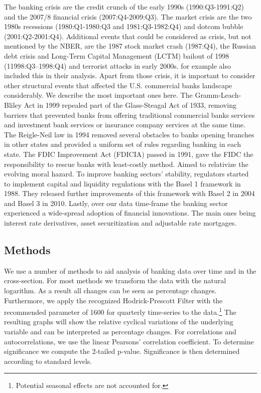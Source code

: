 \documentclass[12pt, a4paper]{article} %
\begin{document}
The banking crisis are the credit crunch of the early 1990s (1990:Q3-1991:Q2) and the 2007/8 financial crisis (2007:Q4-2009:Q3). The market crisis are the two 1980s recessions (1980:Q1-1980:Q3 and 1981:Q3-1982:Q4) and dotcom bubble (2001:Q2-2001:Q4). Additional events that could be considered as crisis, but not mentioned by the NBER, are the 1987 stock market crash (1987:Q4), the Russian debt crisis and Long-Term Capital Management (LCTM) bailout of 1998 (11998:Q3–1998:Q4) and terrorist attacks in early 2000s. \citet{BergerBouwman2013} for example also included this in their analysis.
Apart from those crisis, it is important to consider other structural events that affected the U.S. commercial banks landscape considerably. We describe the most important ones here. 
The Gramm-Leach-Bliley Act in 1999 repealed part of the Glass-Steagal Act of 1933, removing barriers that prevented banks from offering traditional commercial banks services and investment bank services or insurance company services at the same time.  
The Reigle-Neil law in 1994 removed several obstacles to banks opening branches in other states and provided a uniform set of rules regarding banking in each state.
The FDIC Improvement Act (FDICIA) passed in 1991, gave the FIDC the responsibility to rescue banks with least-costly method. Aimed to relativize the evolving moral hazard. To improve banking sectors' stability, regulators started to implement capital and liquidity regulations with the Basel 1 framework in 1988. They released further improvements of this framework with Basel 2 in 2004 and Basel 3 in 2010. Lastly, over our data time-frame the banking sector experienced a wide-spread adoption of financial innovations. The main ones being interest rate derivatives, asset securitization and adjustable rate mortgages. 



\subsection{Methods}

We use a number of methods to aid analysis of banking data over time and in the cross-section.
For most methods we transform the data with the natural logarithm. As a result all changes can be seen as percentage changes. Furthermore, we apply the recognized Hodrick-Prescott Filter with the recommended parameter of 1600 for quarterly time-series to the data.\footnote{Potential seasonal effects are not accounted for.} The resulting graphs will show the relative cyclical variations of the underlying variable and can be interpreted as percentage changes. For correlations and autocorrelations, we use the linear Pearsons' correlation coefficient. To determine significance we compute the 2-tailed p-value. Significance is then determined according to standard levels.

\end{document}
